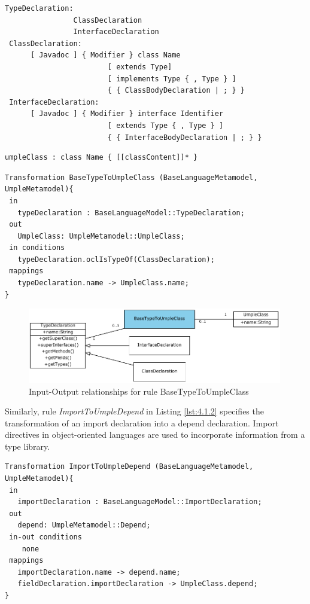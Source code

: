\begin{lstlisting}[style=mine,caption=Grammar for Java Types,label=lst:javaGrammar1]
TypeDeclaration:
                ClassDeclaration
                InterfaceDeclaration
 ClassDeclaration:
      [ Javadoc ] { Modifier } class Name
                        [ extends Type]
                        [ implements Type { , Type } ]
                        { { ClassBodyDeclaration | ; } }
 InterfaceDeclaration:
      [ Javadoc ] { Modifier } interface Identifier
                        [ extends Type { , Type } ]
                        { { InterfaceBodyDeclaration | ; } }
\end{lstlisting}

\begin{lstlisting}[style=mine,caption=Grammar for Umple Classes,label=lst:umpleGrammar2]
 umpleClass : class Name { [[classContent]]* }
\end{lstlisting}

\begin{lstlisting}[style=mine,caption=Rule BaseTypeToUmpleClass,label=lst:4.1.1]
Transformation BaseTypeToUmpleClass (BaseLanguageMetamodel, UmpleMetamodel){ 
 in
   typeDeclaration : BaseLanguageModel::TypeDeclaration;
 out
   UmpleClass: UmpleMetamodel::UmpleClass;
 in conditions
   typeDeclaration.oclIsTypeOf(ClassDeclaration);   
 mappings
   typeDeclaration.name -> UmpleClass.name;
}
\end{lstlisting}

\begin{figure}[h]
\centering
\includegraphics[width=0.99\textwidth]{Figures/ch4InitialMapping.pdf}
\caption{Input-Output relationships for rule BaseTypeToUmpleClass}
\label{fig:4.1.1}
\end{figure}

Similarly, rule  \textit{ImportToUmpleDepend} in Listing \ref{lst:4.1.2} specifies the transformation of an import declaration into a depend declaration. Import directives in object-oriented languages are used to incorporate information from a type library. 

\begin{lstlisting}[style=mine,caption=Rule JavaImportToUmpleDepend,label=lst:4.1.2]
Transformation ImportToUmpleDepend (BaseLanguageMetamodel, UmpleMetamodel){ 
 in
   importDeclaration : BaseLanguageModel::ImportDeclaration;
 out
   depend: UmpleMetamodel::Depend;
 in-out conditions
	none
 mappings
   importDeclaration.name -> depend.name;
   fieldDeclaration.importDeclaration -> UmpleClass.depend;
}
\end{lstlisting}

